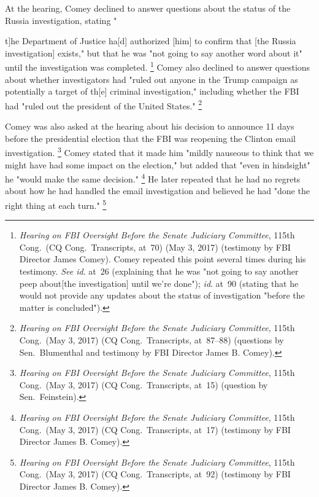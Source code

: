 At the hearing, Comey declined to answer questions about the status of the Russia investigation, stating "{t]he Department of Justice ha[d] authorized [him] to confirm that [the Russia investigation] exists," but that he was "not going to say another word about it" until the investigation was completed.%
\footnote{\textit{Hearing on FBI Oversight Before the Senate Judiciary Committee}, 115th Cong.\ (CQ Cong.\ Transcripts, at~70) (May 3, 2017) (testimony by FBI Director James Comey).
Comey repeated this point several times during his testimony.
\textit{See id}. at~26 (explaining that he was "not going to say another peep about[the investigation] until we're done");
\textit{id}. at~90 (stating that he would not provide any updates about the status of investigation "before the matter is concluded").}
Comey also declined to answer questions about whether investigators had "ruled out anyone in the Trump campaign as potentially a target of th[e] criminal investigation," including whether the FBI had "ruled out the president of the United States."%
\footnote{\textit{Hearing on FBI Oversight Before the Senate Judiciary Committee}, 115th Cong.\ (May 3, 2017) (CQ Cong.\ Transcripts, at~87--88) (questions by Sen.~Blumenthal and testimony by FBI Director James B. Comey).}

Comey was also asked at the hearing about his decision to announce 11 days before the presidential election that the FBI was reopening the Clinton email investigation.%
\footnote{\textit{Hearing on FBI Oversight Before the Senate Judiciary Committee}, 115th Cong.\ (May 3, 2017) (CQ Cong.\ Transcripts, at~15) (question by Sen.~Feinstein).}
Comey stated that it made him "mildly nauseous to think that we might have had some impact on the election," but added that "even in hindsight" he "would make the same decision."%
\footnote{\textit{Hearing on FBI Oversight Before the Senate Judiciary Committee}, 115th Cong.\ (May 3, 2017) (CQ Cong.\ Transcripts, at~17) (testimony by FBI Director James B. Comey).}
He later repeated that he had no regrets about how he had handled the email investigation and believed he had "done the right thing at each turn."%
\footnote{\textit{Hearing on FBI Oversight Before the Senate Judiciary Committee}, 115th Cong.\ (May 3, 2017) (CQ Cong.\ Transcripts, at~92) (testimony by FBI Director James B. Comey).}

}
